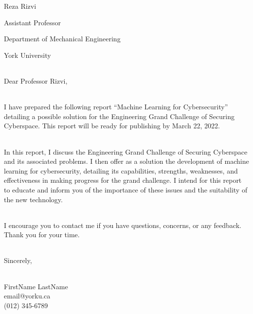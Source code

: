 
\noindent
Reza Rizvi

\noindent
Assistant Professor

\noindent
Department of Mechanical Engineering

\noindent
York University

\noindent
\\Dear Professor Rizvi,

\noindent
\\I have prepared the following report ``Machine Learning for Cybersecurity'' detailing a possible solution for the Engineering Grand Challenge of Securing Cyberspace.
This report will be ready for publishing by March 22, 2022.

\noindent
\\In this report, I discuss the Engineering Grand Challenge of Securing Cyberspace and its associated problems.
I then offer as a solution the development of machine learning for cybersecurity, detailing its capabilities, strengths, weaknesses, and effectiveness in making progress for the grand challenge.
I intend for this report to educate and inform you of the importance of these issues and the suitability of the new technology.

\noindent
\\I encourage you to contact me if you have questions, concerns, or any feedback.
Thank you for your time.

\noindent
\\Sincerely,

\noindent
\\FirstName LastName
\\email@yorku.ca
\\(012) 345-6789
